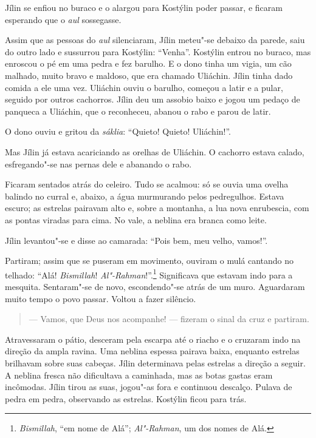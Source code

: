 Jílin se enfiou no buraco e o alargou para Kostýlin poder passar, e
ficaram esperando que o \emph{aul} sossegasse.

Assim que as pessoas do \emph{aul} silenciaram, Jílin meteu"-se debaixo
da parede, saiu do outro lado e sussurrou para Kostýlin: ``Venha''.
Kostýlin entrou no buraco, mas enroscou o pé em uma pedra e fez barulho.
E o dono tinha um vigia, um cão malhado, muito bravo e maldoso, que era
chamado Uliáchin. Jílin tinha dado comida a ele uma vez. Uliáchin ouviu
o barulho, começou a latir e a pular, seguido por outros cachorros.
Jílin deu um assobio baixo e jogou um pedaço de panqueca a Uliáchin, que
o reconheceu, abanou o rabo e parou de latir.

O dono ouviu e gritou da \emph{sáklia}: ``Quieto! Quieto! Uliáchin!''.

Mas Jílin já estava acariciando as orelhas de Uliáchin. O cachorro
estava calado, esfregando"-se nas pernas dele e abanando o rabo.

Ficaram sentados atrás do celeiro. Tudo se acalmou: só se ouvia uma
ovelha balindo no curral e, abaixo, a água murmurando pelos pedregulhos.
Estava escuro; as estrelas pairavam alto e, sobre a montanha, a lua nova
enrubescia, com as pontas viradas para cima. No vale, a neblina era
branca como leite.

Jílin levantou"-se e disse ao camarada: ``Pois bem, meu velho, vamos!''.

Partiram; assim que se puseram em movimento, ouviram o mulá cantando no
telhado: ``Alá! \emph{Bismillah}! \emph{Al"-Rahman}!''.\footnote{\emph{Bismillah},
  ``em nome de Alá''; \emph{Al"-Rahman}, um dos nomes de Alá.}
Significava que estavam indo para a mesquita. Sentaram"-se de novo,
escondendo"-se atrás de um muro. Aguardaram muito tempo o povo passar.
Voltou a fazer silêncio.

\begin{quote}
--- Vamos, que Deus nos acompanhe! --- fizeram o sinal da cruz e
partiram.
\end{quote}

Atravessaram o pátio, desceram pela escarpa até o riacho e o cruzaram
indo na direção da ampla ravina. Uma neblina espessa pairava baixa,
enquanto estrelas brilhavam sobre suas cabeças. Jílin determinava pelas
estrelas a direção a seguir. A neblina fresca não dificultava a
caminhada, mas as botas gastas eram incômodas. Jílin tirou as suas,
jogou"-as fora e continuou descalço. Pulava de pedra em pedra, observando
as estrelas. Kostýlin ficou para trás.

